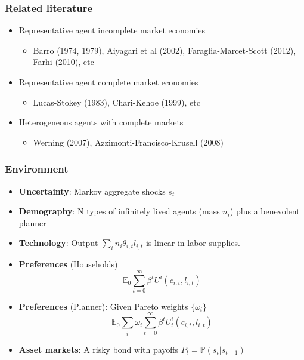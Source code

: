 \documentclass{beamer}
\begin{document}
\begin{frame}%

\frametitle{Related literature}

\begin{itemize}
\item Representative agent incomplete market economies

\begin{itemize}
\item Barro (1974, 1979), Aiyagari et al (2002), Faraglia-Marcet-Scott
(2012), Farhi (2010), etc
\end{itemize}

\item Representative agent complete market economies

\begin{itemize}
\item Lucas-Stokey (1983), Chari-Kehoe (1999), etc
\end{itemize}

\item Heterogeneous agents with complete markets

\begin{itemize}
\item Werning (2007), Azzimonti-Francisco-Krusell (2008)
\end{itemize}
\end{itemize}

\end{frame}%







\begin{frame}
 \frametitle{Environment}
 \begin{itemize}
 \item \textbf{Uncertainty}: Markov aggregate shocks $s_t$
  \item \textbf{Demography}: N  types of infinitely lived agents (mass $n_i$)  plus a benevolent planner
  \item \textbf{Technology}: Output $\sum_{i}n_i \theta_{i,t} l_{i,t}$ is linear in labor supplies.
  \item \textbf{Preferences }(Households)
  \begin{equation*}
\mathbb{E}_{0}\sum_{t=0}^{\infty } \beta^t U^{i}\left(
c_{i,t},l_{i,t}\right)  \label{utility lifetime}
\end{equation*}%
\item \textbf{Preferences} (Planner): Given Pareto weights $\{\omega_i\}$
\begin{equation*}
\mathbb{E}_{0}\sum_{i} \omega_i\sum_{t=0}^{\infty }\beta^t U_{t}^{i}\left( c_{i,t},l_{i,t}\right)  \label{govmt objective}
\end{equation*}
  \item \textbf{Asset markets}: A risky bond with payoffs $P_t=\mathbb{P}(s_t|s_{t-1})$
  \end{itemize}

\end{frame}
\end{document}
